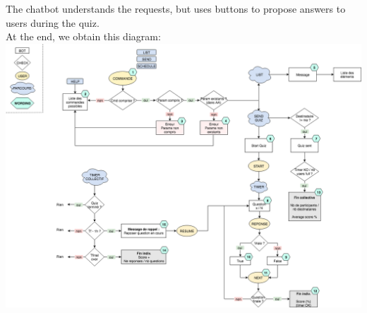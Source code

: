 \documentclass{article}
\begin{document}
The chatbot understands the requests, but uses buttons to propose answers to users during the quiz.\\
\break
At the end, we obtain this diagram:\\
\break
\includegraphics[scale=0.3]{images/quizbot_graph.png}

\newpage
\end{document}
